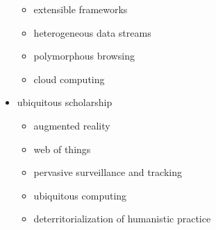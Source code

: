 \begin{itemize}
  \begin{itemize}
    \item extensible frameworks
    \item	heterogeneous data streams
    \item	polymorphous browsing
    \item	cloud computing
  \end{itemize}
  \item ubiquitous scholarship
  \begin{itemize}
    \item augmented reality
    \item	web of things
    \item	pervasive surveillance and tracking
    \item	ubiquitous computing
    \item	deterritorialization of humanistic practice
  \end{itemize}
\end{itemize}